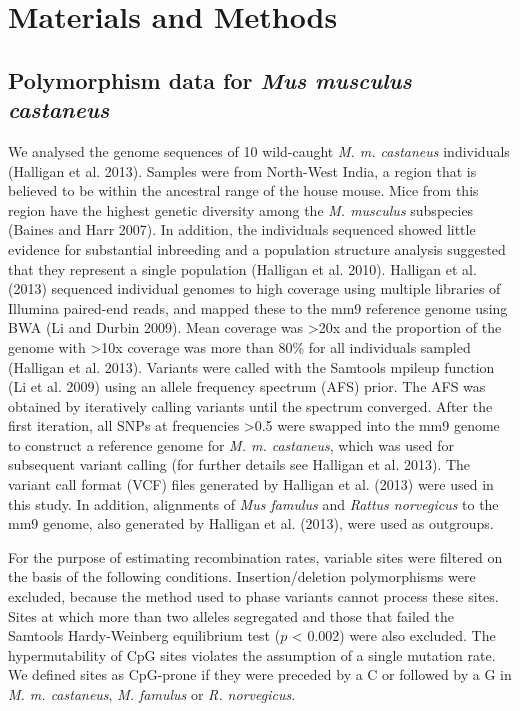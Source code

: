 \section{Materials and Methods}
 
\subsection{Polymorphism data for \textit{Mus musculus castaneus}}
 
We analysed the genome sequences of 10 wild-caught \textit{M. m. castaneus} individuals (Halligan et al. 2013). Samples were from North-West India, a region that is believed to be within the ancestral range of the house mouse. Mice from this region have the highest genetic diversity among the \textit{M. musculus} subspecies (Baines and Harr 2007). In addition, the individuals sequenced showed little evidence for substantial inbreeding and a population structure analysis suggested that they represent a single population (Halligan et al. 2010). Halligan et al. (2013) sequenced individual genomes to high coverage using multiple libraries of Illumina paired-end reads, and mapped these to the mm9 reference genome using BWA (Li and Durbin 2009). Mean coverage was >20x and the proportion of the genome with >10x coverage was more than 80\% for all individuals sampled (Halligan et al. 2013). Variants were called with the Samtools mpileup function (Li et al. 2009) using an allele frequency spectrum (AFS) prior. The AFS was obtained by iteratively calling variants until the spectrum converged. After the first iteration, all SNPs at frequencies >0.5 were swapped into the mm9 genome to construct a reference genome for \textit{M. m. castaneus}, which was used for subsequent variant calling (for further details see Halligan et al. 2013). The variant call format (VCF) files generated by Halligan et al. (2013) were used in this study. In addition, alignments of \textit{Mus famulus} and \textit{Rattus norvegicus} to the mm9 genome, also generated by Halligan et al. (2013), were used as outgroups.
 
	For the purpose of estimating recombination rates, variable sites were filtered on the basis of the following conditions. Insertion/deletion polymorphisms were excluded, because the method used to phase variants cannot process these sites. Sites at which more than two alleles segregated and those that failed the Samtools Hardy-Weinberg equilibrium test ($p$ < 0.002) were also excluded. The hypermutability of CpG sites violates the assumption of a single mutation rate. We defined sites as CpG-prone if they were preceded by a C or followed by a G in \textit{M. m. castaneus}, \textit{M. famulus} or \textit{R. norvegicus}. 
 
